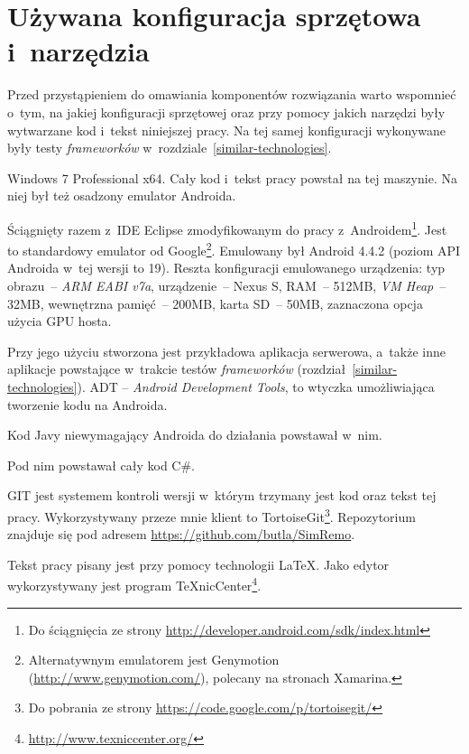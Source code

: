 \section{Używana konfiguracja sprzętowa i~narzędzia}
\label{system-configuration}
Przed przystąpieniem do omawiania komponentów rozwiązania warto wspomnieć o~tym, na jakiej konfiguracji sprzętowej oraz przy pomocy jakich narzędzi były wytwarzane kod i~tekst niniejszej pracy. Na tej samej konfiguracji wykonywane były testy \emph{frameworków} w~rozdziale~\ref{similar-technologies}.

\begin{description}
Windows 7 Professional x64. Cały kod i~tekst pracy powstał na tej maszynie. Na niej był też osadzony emulator Androida.

Ściągnięty razem z~IDE Eclipse zmodyfikowanym do pracy z~Androidem\footnote{Do ściągnięcia ze strony \url{http://developer.android.com/sdk/index.html}}.
Jest to standardowy emulator od Google\footnote{Alternatywnym emulatorem jest Genymotion (\url{http://www.genymotion.com/}), polecany na stronach Xamarina.}.
Emulowany był Android 4.4.2 (poziom API Androida w~tej wersji to 19). Reszta konfiguracji emulowanego urządzenia: typ obrazu~-- \emph{ARM EABI v7a}, urządzenie~-- Nexus S, RAM~-- 512MB, \emph{VM Heap}~-- 32MB, wewnętrzna pamięć~-- 200MB, karta SD~-- 50MB, zaznaczona opcja użycia GPU hosta.

Przy jego użyciu stworzona jest przykładowa aplikacja serwerowa, a~także inne aplikacje powstające w~trakcie testów \emph{frameworków} (rozdział~\ref{similar-technologies}). ADT -- \emph{Android Development Tools}, to wtyczka umożliwiająca tworzenie kodu na Androida.

Kod Javy niewymagający Androida do działania powstawał w~nim.

Pod nim powstawał cały kod C\#.

GIT jest systemem kontroli wersji w~którym trzymany jest kod oraz tekst tej pracy. Wykorzystywany przeze mnie klient to TortoiseGit\footnote{Do pobrania ze strony \url{https://code.google.com/p/tortoisegit/}}. Repozytorium znajduje się pod adresem \url{https://github.com/butla/SimRemo}.

\itemtitle{\LaTeX}
Tekst pracy pisany jest przy pomocy technologii \LaTeX. Jako edytor wykorzystywany jest program TeXnicCenter\footnote{\url{http://www.texniccenter.org/}}.
\end{description}

